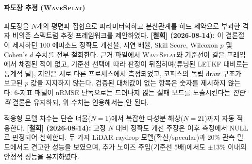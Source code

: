 \documentclass[11pt]{report}
\numberwithin{equation}{chapter}
\numberwithin{figure}{chapter}
\numberwithin{table}{chapter}
\newcommand{\WS}{\textsc{WaveSplat}}
\begin{document}
\paragraph{파도장 추정 (\WS{})}
파도장을 $N$개의 평면파 집합으로 파라미터화하고
분산관계를 하드 제약으로 부과한 격자 비의존 스펙트럼 추정 프레임워크를 제안하였다.
\textbf{[철회] (2026-08-14):} 이 결론절이 제시하던 100 에피소드 정확도 개선율,
지연 배율, Skill Score, Wilcoxon $p$ 및 Cohen's $d$ 수치를 전부 철회한다.
근거 파일에서 \WS{}와 기준선이 같은 프레임에서 채점된 적이 없고, 기준선 선택에 따라
판정이 뒤집히며(튜닝된 LETKF 대비로는 통계적 널), 지연은 서로 다른 프로세스에서
측정되었고, 코퍼스의 독립 draw 구조가 보고된 $p$ 값을 지지하지 않는다.
검증된 대체값이 없는 항목은 숫자를 제시하지 않는다.
6-지표 패널이 nRMSE 단독으로는 드러나지 않는 실패 모드를 노출시킨다는
\emph{진단적} 결론은 유지하되, 위 수치는 인용해서는 안 된다.

적응형 모델 차수는 단순 너울($N=1$)에서 복잡한 다성분 해상($N=21$)까지
자동 적응한다.
\textbf{[철회] (2026-08-14):} 고정 $N$ 대비 정확도 개선 주장은 이후 측정에서
NULL 로 판정되어 철회한다.
두 가지 LiDAR raydrop 모델(확산/specular)과 20\% 관측 밀도에서도
견고한 성능을 보였으며, 추가 노이즈 주입(기준선 5배)에서도
$\pm$13\% 이내의 안정적 성능을 유지하였다.
\end{document}
